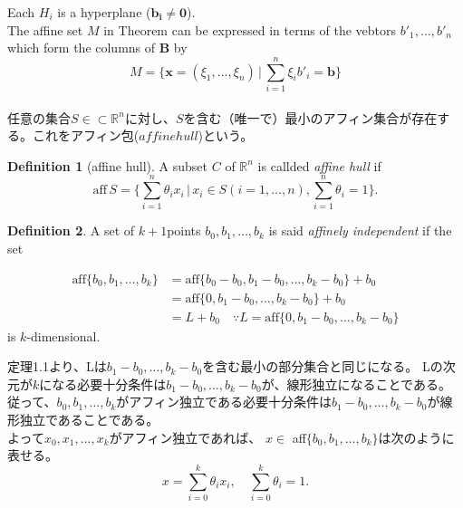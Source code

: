 \documentclass{jsarticle}
\theoremstyle{definition}
\newtheorem{dfn}{Definition}[section]
\begin{document}
Each $H_i$ is a hyperplane ($\bm{b_i} \neq \bm{0}$).\\


The affine set $M$ in Theorem can be expressed in terms of the
vebtors $b'_1, ..., b'_n$ which form the columns of $\bm{B}$ by
\[
M = \{ \bm{x} = ( \xi_1, ..., \xi_n) \, | \, \sum
\limits_{i=1}^n \xi_i b'_i = \bm{b} \}
\]
\\


任意の集合$S \in \subset
\mathbb{R}^n$に対し、$S$を含む（唯一で）最小のアフィン集合が存在する。これをアフィン包($affine
hull$)という。\\



\begin{dfn}[affine hull]
A subset $C$ of $\mathbb{R}^n $ is callded \textit{affine hull }if
\[
\text{aff} \, S = \{ \sum \limits_{i=1}^n \theta_i x_i \, | \,
x_i \in S (i = 1,...,n), \sum \limits_{i=1}^n \theta_i = 1\} .
\]
\end{dfn}






\begin{dfn}
A set of $k+1$points $b_0, b_1, \dots , b_k$ is  said \textit{affinely independent} if the set 

\begin{align*}
\text{aff}  \{b_0,  b_1,  \dots,  b_k\} &= \text{aff} \{b_0 - b_0,  b_1 - b_0,  \dots,  b_k - b_0\}  + b_0\\
                                           &=  \text{aff} \{0,  b_1 - b_0,  \dots,  b_k - b_0\} + b_0\\
                                           &= L + b_0  \quad \because L = \text{aff} \{0,  b_1 - b_0,  \dots,  b_k - b_0\}
\end{align*}
 is $k$-dimensional.

\end{dfn}


定理1.1より、Lは$b_1 - b_0,  \dots,  b_k - b_0$を含む最小の部分集合と同じになる。
Lの次元が$k$になる必要十分条件は$b_1 - b_0,  \dots,  b_k - b_0$が、線形独立になることである。
従って、$b_0,  b_1,  \dots,  b_k$がアフィン独立である必要十分条件は$b_1 - b_0,  \dots,  b_k - b_0$が線形独立であることである。\\

よって$x_0, x_1, \dots, x_k$がアフィン独立であれば、 $x \in$ aff$\{b_0,  b_1,  \dots,  b_k\}$は次のように表せる。
\[
x = \sum \limits_{i=0}^{k} \theta_i x_i, \quad \sum \limits_{i=0}^{k} \theta_i = 1. 
\]\\
\end{document}
